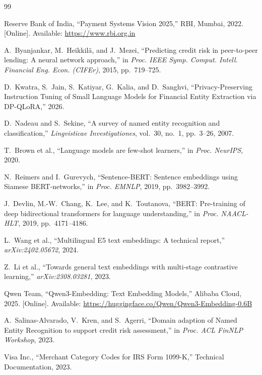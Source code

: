 \documentclass[conference]{IEEEtran}
\begin{document}
\begin{thebibliography}{99}

Reserve Bank of India, ``Payment Systems Vision 2025,'' RBI, Mumbai, 2022. [Online]. Available: \url{https://www.rbi.org.in}

A.~Byanjankar, M.~Heikkilä, and J.~Mezei, ``Predicting credit risk in peer-to-peer lending: A neural network approach,'' in \textit{Proc. IEEE Symp. Comput. Intell. Financial Eng. Econ. (CIFEr)}, 2015, pp.~719--725.

D.~Kwatra, S.~Jain, S.~Katiyar, G.~Kalia, and D.~Sanghvi, ``Privacy-Preserving Instruction Tuning of Small Language Models for Financial Entity Extraction via DP-QLoRA,'' 2026.

D.~Nadeau and S.~Sekine, ``A survey of named entity recognition and classification,'' \textit{Lingvisticae Investigationes}, vol.~30, no.~1, pp.~3--26, 2007.

T.~Brown et al., ``Language models are few-shot learners,'' in \textit{Proc. NeurIPS}, 2020.

N.~Reimers and I.~Gurevych, ``Sentence-BERT: Sentence embeddings using Siamese BERT-networks,'' in \textit{Proc. EMNLP}, 2019, pp.~3982--3992.

J.~Devlin, M.-W.~Chang, K.~Lee, and K.~Toutanova, ``BERT: Pre-training of deep bidirectional transformers for language understanding,'' in \textit{Proc. NAACL-HLT}, 2019, pp.~4171--4186.

L.~Wang et al., ``Multilingual E5 text embeddings: A technical report,'' \textit{arXiv:2402.05672}, 2024.

Z.~Li et al., ``Towards general text embeddings with multi-stage contrastive learning,'' \textit{arXiv:2308.03281}, 2023.

Qwen Team, ``Qwen3-Embedding: Text Embedding Models,'' Alibaba Cloud, 2025. [Online]. Available: \url{https://huggingface.co/Qwen/Qwen3-Embedding-0.6B}

A.~Salinas-Alvarado, V.~Kren, and S.~Agerri, ``Domain adaption of Named Entity Recognition to support credit risk assessment,'' in \textit{Proc. ACL FinNLP Workshop}, 2023.

Visa Inc., ``Merchant Category Codes for IRS Form 1099-K,'' Technical Documentation, 2023.


\end{thebibliography}
\end{document}
